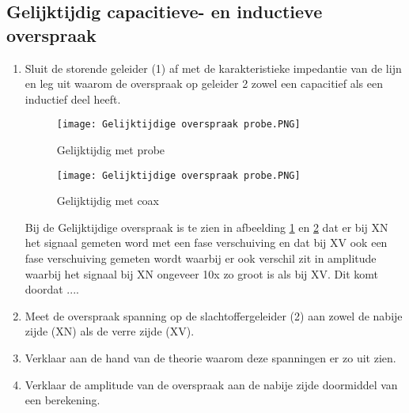 \subsection{Gelijktijdig capacitieve- en inductieve overspraak}
\begin{enumerate}
    \item Sluit de storende geleider (1) af met de karakteristieke impedantie van de lijn en leg uit
    waarom de overspraak op geleider 2 zowel een capacitief als een inductief deel heeft.

    \begin{figure}[H]
        \centering
        \texttt{[image: Gelijktijdige overspraak probe.PNG]}
        \caption{Gelijktijdig met probe}
        \label{fig:Gelijktijdig met probe}
    \end{figure}

    \begin{figure}[H]
        \centering
        \texttt{[image: Gelijktijdige overspraak probe.PNG]}
        \caption{Gelijktijdig met coax}
        \label{fig:Gelijktijdig met coax}
    \end{figure}

    Bij de Gelijktijdige overspraak is te zien in afbeelding \ref{fig:Gelijktijdig met probe} en \ref{fig:Gelijktijdig met coax} dat er bij XN het signaal gemeten word met een fase verschuiving en dat bij XV ook een fase verschuiving gemeten wordt waarbij er ook verschil zit in amplitude waarbij het signaal bij XN ongeveer 10x zo groot is als bij XV. Dit komt doordat ....

    \item Meet de overspraak spanning op de slachtoffergeleider (2) aan zowel de nabije zijde (XN) als de verre zijde (XV).

    \item Verklaar aan de hand van de theorie waarom deze spanningen er zo uit zien.
    
    \item Verklaar de amplitude van de overspraak aan de nabije zijde doormiddel van een berekening.

\end{enumerate}
